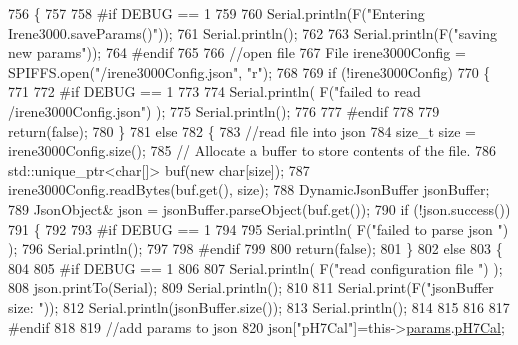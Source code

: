 \begin{DoxyCode}
756 \{
757 
758 \textcolor{preprocessor}{#if DEBUG == 1}
759         
760     Serial.println(F(\textcolor{stringliteral}{"Entering Irene3000.saveParams()"}));
761     Serial.println();
762     
763     Serial.println(F(\textcolor{stringliteral}{"saving new params"}));
764 \textcolor{preprocessor}{#endif}
765     
766     \textcolor{comment}{//open file}
767     File irene3000Config = SPIFFS.open(\textcolor{stringliteral}{"/irene3000Config.json"}, \textcolor{stringliteral}{"r"});
768 
769     \textcolor{keywordflow}{if} (!irene3000Config) 
770     \{
771     
772 \textcolor{preprocessor}{    #if DEBUG == 1 }
773 
774         Serial.println( F(\textcolor{stringliteral}{"failed to read /irene3000Config.json"}) );
775         Serial.println();
776     
777 \textcolor{preprocessor}{    #endif}
778 
779         \textcolor{keywordflow}{return}(\textcolor{keyword}{false});
780     \}
781     \textcolor{keywordflow}{else}
782     \{
783         \textcolor{comment}{//read file into json}
784         \textcolor{keywordtype}{size\_t} size = irene3000Config.size();
785         \textcolor{comment}{// Allocate a buffer to store contents of the file.}
786         std::unique\_ptr<char[]> buf(\textcolor{keyword}{new} \textcolor{keywordtype}{char}[size]);
787             irene3000Config.readBytes(buf.get(), size);
788         DynamicJsonBuffer jsonBuffer;
789         JsonObject& json = jsonBuffer.parseObject(buf.get());
790         \textcolor{keywordflow}{if} (!json.success()) 
791         \{
792         
793 \textcolor{preprocessor}{        #if DEBUG == 1 }
794 
795             Serial.println( F(\textcolor{stringliteral}{"failed to parse json "}) );
796             Serial.println();
797         
798 \textcolor{preprocessor}{        #endif}
799             
800             \textcolor{keywordflow}{return}(\textcolor{keyword}{false});
801         \} 
802         \textcolor{keywordflow}{else}
803         \{
804         
805 \textcolor{preprocessor}{        #if DEBUG == 1 }
806     
807             Serial.println( F(\textcolor{stringliteral}{"read configuration file "}) );
808             json.printTo(Serial);
809             Serial.println();
810 
811             Serial.print(F(\textcolor{stringliteral}{"jsonBuffer size: "}));
812             Serial.println(jsonBuffer.size());
813             Serial.println();
814 
815         
816 
817 \textcolor{preprocessor}{        #endif          }
818     
819             \textcolor{comment}{//add params to json}
820             json[\textcolor{stringliteral}{"pH7Cal"}]=this->\hyperlink{class_irene3000_a136585a5ee7f9ac6ab52175fa153f8e3}{params}.\hyperlink{struct_irene3000_1_1parameters___t_a21265466a570d84bff914f26d2f7a03e}{pH7Cal};

\end{DoxyCode}
